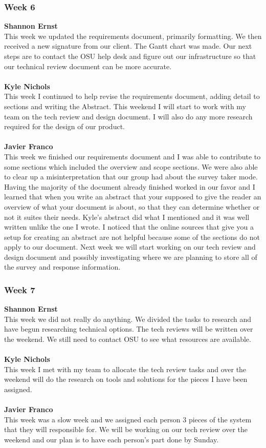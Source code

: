 \documentclass[../final.tex]{subfiles}
\begin{document}
\subsubsection{Week 6}
\textbf{Shannon Ernst}\\
This week we updated the requirements document, primarily formatting. We then received a new signature from our client. The Gantt chart was made. Our next steps are to contact the OSU help desk and figure out our infrastructure so that our technical review document can be more accurate. \\ \\
\textbf{Kyle Nichols}\\
This week I continued to help revise the requirements document, adding detail to sections and writing the Abstract. This weekend I will start to work with my team on the tech review and design document. I will also do any more research required for the design of our product. \\ \\
\textbf{Javier Franco}\\
This week we finished our requirements document and I was able to contribute to some sections which included the overview and scope sections. We were also able to clear up a misinterpretation that our group had about the survey taker mode. Having the majority of the document already finished worked in our favor and I learned that when you write an abstract that your supposed to give the reader an overview of what your document is about, so that they can determine whether or not it suites their needs. Kyle's abstract did what I mentioned and it was well written unlike the one I wrote. I noticed that the online sources that give you a setup for creating an abstract are not helpful because some of the sections do not apply to our document. Next week we will start working on our tech review and design document and possibly investigating where we are planning to store all of the survey and response information. \\
\subsubsection{Week 7}
\textbf{Shannon Ernst}\\
This week we did not really do anything. We divided the tasks to research and have begun researching technical options. The tech reviews will be written over the weekend. We still need to contact OSU to see what resources are available. \\ \\
\textbf{Kyle Nichols}\\
This week I met with my team to allocate the tech review tasks and over the weekend will do the research on tools and solutions for the pieces I have been assigned. \\ \\
\textbf{Javier Franco}\\ 
This week was a slow week and we assigned each person 3 pieces of the system that they will responsible for. We will be working on our tech review over the weekend and our plan is to have each person's part done by Sunday.\\
\end{document}
